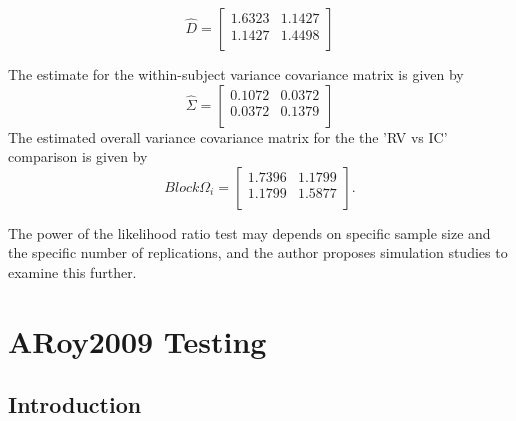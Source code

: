 \documentclass[12pt, a4paper]{report}
\theoremstyle{plain}
\theoremstyle{definition}
\theoremstyle{remark}
\begin{document}
	
	\begin{equation}
	\hat{D}= \left[ \begin{array}{cc}
	1.6323 & 1.1427  \\
	1.1427 & 1.4498 \\
	\end{array} \right]
	\end{equation}
	
	The estimate for the within-subject variance covariance matrix is
	given by
	\begin{equation}
	\hat{\Sigma}= \left[ \begin{array}{cc}
	0.1072 & 0.0372  \\
	0.0372 & 0.1379  \\
	\end{array}\right]
	\end{equation}
	The estimated overall variance covariance matrix for the the 'RV
	vs IC' comparison is given by
	\begin{equation}
	Block \Omega_{i}= \left[ \begin{array}{cc}
	1.7396 & 1.1799  \\
	1.1799 & 1.5877  \\
	\end{array} \right].
	\end{equation}
	
	The power of the likelihood ratio test may depends on specific sample size and the
	specific number of  replications, and the author proposes simulation studies to examine this further.
	
	
	\chapter{ARoy2009 Testing}
	
	
	\section{Introduction}
	
\end{document}
